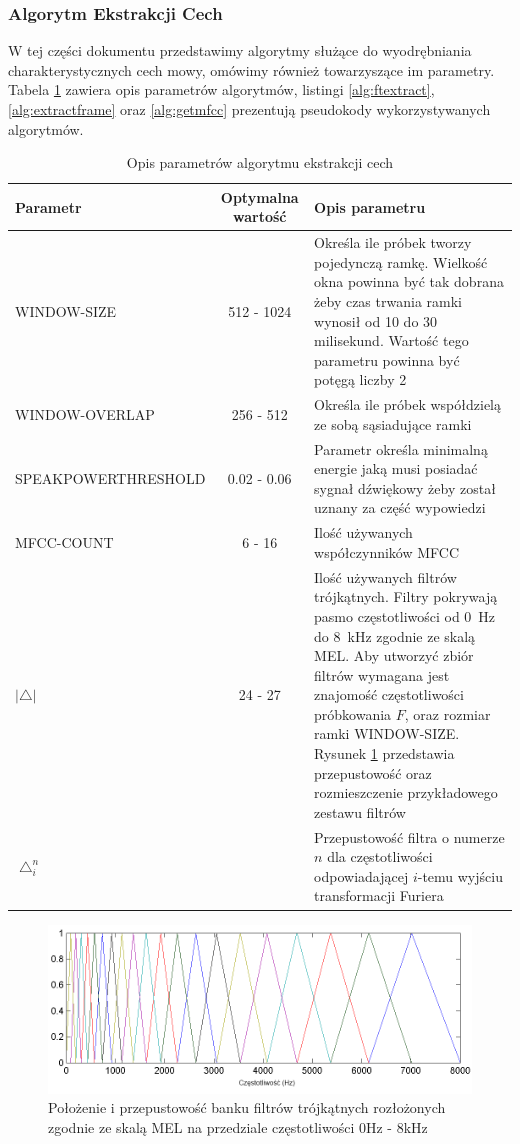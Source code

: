 \documentclass[a4paper]{article}
\begin{document}
		\subsubsection*{Algorytm Ekstrakcji Cech}
		W tej części dokumentu przedstawimy algorytmy służące do 
		wyodrębniania charakterystycznych cech mowy, omówimy również
		towarzyszące im parametry. Tabela \ref{tab:ftextractparams} zawiera
		opis parametrów algorytmów, listingi \ref{alg:ftextract}, \ref{alg:extractframe}
		oraz \ref{alg:getmfcc} prezentują pseudokody wykorzystywanych algorytmów.
		\begin{table}[h]
			\centering
			\begin{tabular}{|p{2.5cm}|c|p{6cm}|}
				\hline
				Parametr & Optymalna wartość & Opis parametru \\
				\hline \hline
				WINDOW-SIZE & 512 - 1024 & Określa ile próbek tworzy pojedynczą
				ramkę. Wielkość okna powinna być tak dobrana żeby czas trwania ramki
				wynosił od 10 do 30 milisekund. Wartość tego parametru powinna być potęgą liczby 2\\
				\hline
				WINDOW-OVERLAP & 256 - 512 & Określa ile próbek współdzielą ze sobą sąsiadujące ramki\\
				\hline
				SPEAK\-POWER\-THRESHOLD & 0.02 - 0.06 & Parametr określa minimalną energie jaką musi
				posiadać sygnał dźwiękowy żeby został uznany za część wypowiedzi \\
				\hline
				MFCC-COUNT & 6 - 16 & Ilość używanych współczynników MFCC \\				
				\hline
				$|\bigtriangleup|$ & 24 - 27 & Ilość używanych filtrów trójkątnych. Filtry pokrywają
				pasmo częstotliwości od 0~Hz do 8~kHz zgodnie ze skalą MEL. Aby utworzyć zbiór filtrów
				wymagana jest znajomość częstotliwości próbkowania $F$, oraz rozmiar ramki WINDOW-SIZE. 
				Rysunek \ref{fig:trifilter} przedstawia przepustowość oraz rozmieszczenie
				przykładowego zestawu filtrów \\
				\hline				
				$\bigtriangleup_i^n$ & & Przepustowość filtra o numerze $n$ dla częstotliwości odpowiadającej
				$i$-temu wyjściu transformacji Furiera \\
				\hline
			\end{tabular}			
			\caption{Opis parametrów algorytmu ekstrakcji cech}
			\label{tab:ftextractparams}
		\end{table}
		\begin{figure}[h]
			\includegraphics[width=\textwidth,trim= 0cm 0cm 0cm 0cm, clip]{./img/triFilter}
			\caption{Położenie i przepustowość banku filtrów trójkątnych rozłożonych zgodnie 
			ze skalą MEL na przedziale częstotliwości 0Hz - 8kHz}
			\label{fig:trifilter}
		\end{figure}
		
\end{document}
